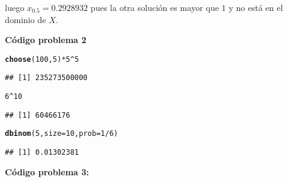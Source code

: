 \documentclass[12pt]{article}\usepackage[]{graphicx}\usepackage[]{color}
\makeatletter
\newcommand{\hlnum}[1]{\textcolor[rgb]{0.686,0.059,0.569}{#1}}%
\newcommand{\hlopt}[1]{\textcolor[rgb]{0,0,0}{#1}}%
\newcommand{\hlstd}[1]{\textcolor[rgb]{0.345,0.345,0.345}{#1}}%
\newcommand{\hlkwc}[1]{\textcolor[rgb]{0.333,0.667,0.333}{#1}}%
\newcommand{\hlkwd}[1]{\textcolor[rgb]{0.737,0.353,0.396}{\textbf{#1}}}%
\newenvironment{kframe}{%
 \def\at@end@of@kframe{}%
 \ifinner\ifhmode%
  \def\at@end@of@kframe{\end{minipage}}%
  \begin{minipage}{\columnwidth}%
 \fi\fi%
 \def\FrameCommand##1{\hskip\@totalleftmargin \hskip-\fboxsep
 \colorbox{shadecolor}{##1}\hskip-\fboxsep
     \hskip-\linewidth \hskip-\@totalleftmargin \hskip\columnwidth}%
 \MakeFramed {\advance\hsize-\width
   \@totalleftmargin\z@ \linewidth\hsize
   \@setminipage}}%
 {\par\unskip\endMakeFramed%
 \at@end@of@kframe}
\newenvironment{knitrout}{}{} %
\makeatother
\begin{document}
luego $x_{0.5}=0.2928932$ pues la otra solución es mayor que $1$ y  no está en el dominio de $X$.





\newpage

\textbf{Código problema 2}



\begin{knitrout}\scriptsize
{}\color{fgcolor}\begin{kframe}
\begin{alltt}
\hlkwd{choose}\hlstd{(}\hlnum{100}\hlstd{,}\hlnum{5}\hlstd{)}\hlopt{*}\hlnum{5}\hlopt{^}\hlnum{5}
\end{alltt}
\begin{verbatim}
## [1] 235273500000
\end{verbatim}
\begin{alltt}
\hlnum{6}\hlopt{^}\hlnum{10}
\end{alltt}
\begin{verbatim}
## [1] 60466176
\end{verbatim}
\begin{alltt}
\hlkwd{dbinom}\hlstd{(}\hlnum{5}\hlstd{,}\hlkwc{size}\hlstd{=}\hlnum{10}\hlstd{,}\hlkwc{prob}\hlstd{=}\hlnum{1}\hlopt{/}\hlnum{6}\hlstd{)}
\end{alltt}
\begin{verbatim}
## [1] 0.01302381
\end{verbatim}
\end{kframe}
\end{knitrout}


\textbf{Código problema 3:}
\end{document}
